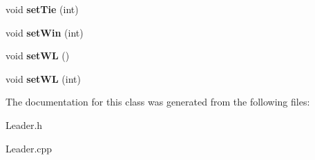 \begin{DoxyCompactItemize}
void {\bfseries set\+Tie} (int)
\item 
\mbox{\label{class_leader_ae96005e7c96b12d0f34afce15ef31bdc}} 
void {\bfseries set\+Win} (int)
\item 
\mbox{\label{class_leader_a63435337152c2883cf7458a21fc16bcf}} 
void {\bfseries set\+WL} ()
\item 
\mbox{\label{class_leader_ae74f2413377bca472cc7aee0d38bd3ca}} 
void {\bfseries set\+WL} (int)
\end{DoxyCompactItemize}


The documentation for this class was generated from the following files\+:\begin{DoxyCompactItemize}
\item 
Leader.\+h\item 
Leader.\+cpp\end{DoxyCompactItemize}
